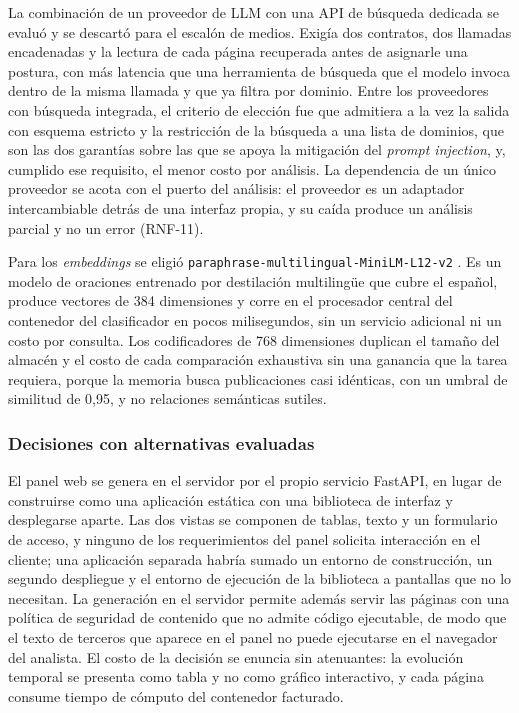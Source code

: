 La combinación de un proveedor de LLM con una API de búsqueda dedicada se evaluó y se descartó para el escalón de medios. Exigía dos contratos, dos llamadas encadenadas y la lectura de cada página recuperada antes de asignarle una postura, con más latencia que una herramienta de búsqueda que el modelo invoca dentro de la misma llamada y que ya filtra por dominio. Entre los proveedores con búsqueda integrada, el criterio de elección fue que admitiera a la vez la salida con esquema estricto y la restricción de la búsqueda a una lista de dominios, que son las dos garantías sobre las que se apoya la mitigación del \textit{prompt injection}, y, cumplido ese requisito, el menor costo por análisis. La dependencia de un único proveedor se acota con el puerto del análisis: el proveedor es un adaptador intercambiable detrás de una interfaz propia, y su caída produce un análisis parcial y no un error (RNF-11).

Para los \textit{embeddings} se eligió \texttt{paraphrase-\allowbreak multilingual-\allowbreak MiniLM-L12-v2} \parencite{ReimersGurevych2020}. Es un modelo de oraciones entrenado por destilación multilingüe que cubre el español, produce vectores de 384 dimensiones y corre en el procesador central del contenedor del clasificador en pocos milisegundos, sin un servicio adicional ni un costo por consulta. Los codificadores de 768 dimensiones duplican el tamaño del almacén y el costo de cada comparación exhaustiva sin una ganancia que la tarea requiera, porque la memoria busca publicaciones casi idénticas, con un umbral de similitud de 0,95, y no relaciones semánticas sutiles.

\subsubsection{Decisiones con alternativas evaluadas}

El panel web se genera en el servidor por el propio servicio FastAPI, en lugar de construirse como una aplicación estática con una biblioteca de interfaz y desplegarse aparte. Las dos vistas se componen de tablas, texto y un formulario de acceso, y ninguno de los requerimientos del panel solicita interacción en el cliente; una aplicación separada habría sumado un entorno de construcción, un segundo despliegue y el entorno de ejecución de la biblioteca a pantallas que no lo necesitan. La generación en el servidor permite además servir las páginas con una política de seguridad de contenido que no admite código ejecutable, de modo que el texto de terceros que aparece en el panel no puede ejecutarse en el navegador del analista. El costo de la decisión se enuncia sin atenuantes: la evolución temporal se presenta como tabla y no como gráfico interactivo, y cada página consume tiempo de cómputo del contenedor facturado.

